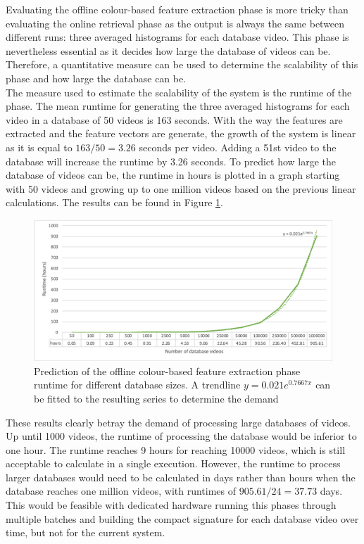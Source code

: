 Evaluating the offline colour-based feature extraction phase is more tricky than evaluating the online retrieval phase as the output is always the same between different runs: three averaged histograms for each database video. This phase is nevertheless essential as it decides how large the database of videos can be. Therefore, a quantitative measure can be used to determine the scalability of this phase and how large the database can be.\\

The measure used to estimate the scalability of the system is the runtime of the phase. The mean runtime for generating the three averaged histograms for each video in a database of 50 videos is 163 seconds. With the way the features are extracted and the feature vectors are generate, the growth of the system is linear as it is equal to $163/50=3.26$ seconds per video. Adding a 51st video to the database will increase the runtime by 3.26 seconds. To predict how large the database of videos can be, the runtime in hours is plotted in a graph starting with 50 videos and growing up to one million videos based on the previous linear calculations. The results can be found in Figure \ref{fig:evaluation-offline_phase_runtime_trendline}.

\begin{figure}[h]
\centerline{\includegraphics[width=\textwidth]{figures/evaluation/offline_phase_runtime_trendline.png}}
\caption{\label{fig:evaluation-offline_phase_runtime_trendline}Prediction of the offline colour-based feature extraction phase runtime for different database sizes. A trendline $y=0.021e^{0.7667x}$ can be fitted to the resulting series to determine the demand }
\end{figure}

These results clearly betray the demand of processing large databases of videos. Up until 1000 videos, the runtime of processing the database would be inferior to one hour. The runtime reaches 9 hours for reaching 10000 videos, which is still acceptable to calculate in a single execution. However, the runtime to process larger databases would need to be calculated in days rather than hours when the database reaches one million videos, with runtimes of $905.61/24=37.73$ days. This would be feasible with dedicated hardware running this phases through multiple batches and building the compact signature for each database video over time, but not for the current system.

